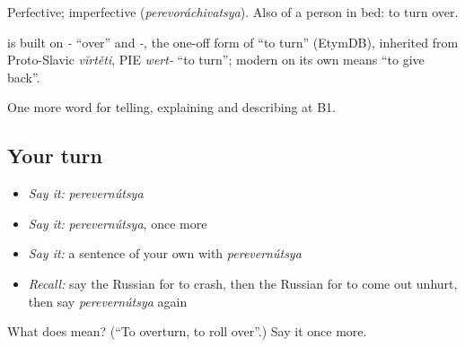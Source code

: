 Perfective; imperfective \emph{} (\emph{perevoráchivatsya}). Also of a person in bed: to turn over.

\begin{cousinweb}
\emph{} is built on \emph{-} \textquotedblleft{}over\textquotedblright{} and \emph{-}, the one-off form of \emph{} \textquotedblleft{}to turn\textquotedblright{} (EtymDB), inherited from Proto-Slavic \emph{vĭrtěti}, PIE \emph{wert-} \textquotedblleft{}to turn\textquotedblright{}; modern \emph{} on its own means \textquotedblleft{}to give back\textquotedblright{}.
\end{cousinweb}

\begin{grammarlens}[title={What you've built}]
One more word for telling, explaining and describing at B1.
\end{grammarlens}

\subsection*{Your turn}
\begin{itemize}
\raggedright
  \item \emph{Say it:} \emph{perevernútsya}
  \item \emph{Say it:} \emph{perevernútsya}, once more
  \item \emph{Say it:} a sentence of your own with \emph{perevernútsya}
  \item \emph{Recall:} say the Russian for to crash, then the Russian for to come out unhurt, then say \emph{perevernútsya} again
\end{itemize}

\begin{tcolorbox}[breakable,colback=teal!4,colframe=teal!35!black,title={Before you move on}]
What does  mean? (\textquotedblleft{}To overturn, to roll over\textquotedblright{}.) Say it once more.
\end{tcolorbox}
